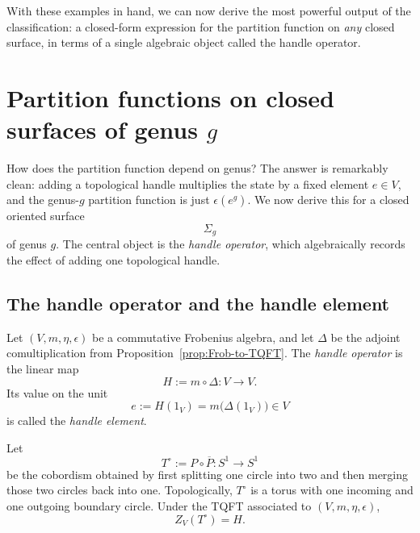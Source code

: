 \medskip

\noindent With these examples in hand, we can now derive the most powerful output of the classification: a closed-form expression for the partition function on \emph{any} closed surface, in terms of a single algebraic object called the handle operator.

\section{Partition functions on closed surfaces of genus \texorpdfstring{$g$}{g}}\label{sec:genus-g-partition}

How does the partition function depend on genus?  The answer is remarkably clean: adding a topological handle multiplies the state by a fixed element $e \in V$, and the genus-$g$ partition function is just $\epsilon(e^g)$.  We now derive this for a closed oriented surface
\begin{equation}\label{eq:Sigma-g}
\Sigma_g
\end{equation}
of genus $g$. The central object is the \emph{handle operator}, which algebraically records the effect of adding one topological handle.

\subsection{The handle operator and the handle element}

\begin{definition}\label{def:handle-operator}
Let $(V,m,\eta,\epsilon)$ be a commutative Frobenius algebra, and let $\Delta$ be the adjoint comultiplication from Proposition~\ref{prop:Frob-to-TQFT}. The \emph{handle operator} is the linear map
\begin{equation}\label{eq:handle-operator}
H := m \circ \Delta : V \longrightarrow V.
\end{equation}
Its value on the unit
\begin{equation}\label{eq:handle-element}
e := H(1_V) = m\bigl(\Delta(1_V)\bigr) \in V
\end{equation}
is called the \emph{handle element}.
\end{definition}

\begin{proposition}\label{prop:punctured-torus-handle}
Let
\begin{equation}\label{eq:punctured-torus-cobordism}
T^\circ := P \circ \overline{P} : S^1 \longrightarrow S^1
\end{equation}
be the cobordism obtained by first splitting one circle into two and then merging those two circles back into one. Topologically, $T^\circ$ is a torus with one incoming and one outgoing boundary circle. Under the TQFT associated to $(V,m,\eta,\epsilon)$,
\begin{equation}\label{eq:punctured-torus-map}
Z_V(T^\circ)=H.
\end{equation}
\end{proposition}

